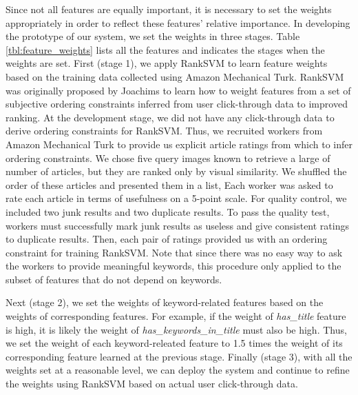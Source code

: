 \documentclass{www2010-submission}
\begin{document}
Since not all features are equally important, it is necessary to set
the weights appropriately in order to reflect these features' relative
importance. In developing the prototype of our system, we set the
weights in three stages. Table \ref{tbl:feature_weights} lists all the
features and indicates the stages when the weights are set. First
(stage 1), we apply RankSVM to learn feature weights based on the
training data collected using Amazon Mechanical Turk. RankSVM was
originally proposed by Joachims \cite{Joachims} to learn how to weight
features from a set of subjective ordering constraints inferred from
user click-through data to improved ranking. At the development stage,
we did not have any click-through data to derive ordering constraints
for RankSVM. Thus, we recruited workers from Amazon Mechanical Turk to
provide us explicit article ratings from which to infer ordering
constraints. We chose five query images known to retrieve a large of
number of articles, but they are ranked only by visual similarity. We
shuffled the order of these articles and presented them in a list,
Each worker was asked to rate each article in terms of usefulness on a
5-point scale. For quality control, we included two junk results and
two duplicate results. To pass the quality test, workers must
successfully mark junk results as useless and give consistent ratings
to duplicate results. Then, each pair of ratings provided us with an
ordering constraint for training RankSVM. Note that since there was no
easy way to ask the workers to provide meaningful keywords, this
procedure only applied to the subset of features that do not depend on
keywords.

Next (stage 2), we set the weights of keyword-related features based
on the weights of corresponding features. For example, if the weight
of \emph{has\_title} feature is high, it is likely the weight of
\emph{has\_keywords\_in\_title} must also be high. Thus, we set the
weight of each keyword-releated feature to 1.5 times the weight of its
corresponding feature learned at the previous stage. Finally (stage
3), with all the weights set at a reasonable level, we can deploy the
system and continue to refine the weights using RankSVM based on
actual user click-through data.
\end{document}
